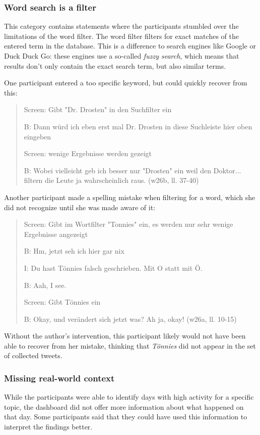 \subsubsection*{Word search is a filter}
This category contains statements where the participants stumbled over the limitations of the word filter. The word filter filters for exact matches of the entered term in the database. This is a difference to search engines like Google or Duck Duck Go: these engines use a so-called \emph{fuzzy search}, which means that results don't only contain the exact search term, but also similar terms.

One participant entered a too specific keyword, but could quickly recover from this:

\begin{quote}
    Screen: Gibt "Dr. Drosten" in den Suchfilter ein

    B: Dann würd ich eben erst mal Dr. Drosten in diese Suchleiste hier oben eingeben

    Screen: wenige Ergebnisse werden gezeigt

    B: Wobei vielleicht geb ich besser nur "Drosten" ein weil den Doktor... filtern die Leute ja wahrscheinlich raus. (w26b, ll. 37-40)
\end{quote}

Another participant made a spelling mistake when filtering for a word, which she did not recognize until she was made aware of it:

\begin{quote}
    Screen: Gibt im Wortfilter "Tonnies" ein, es werden nur sehr wenige Ergebnisse angezeigt

    B: Hm, jetzt seh ich hier gar nix

    I: Du hast T\"onnies falsch geschrieben. Mit O statt mit \"O.
    
    B: Aah, I see. 

    Screen: Gibt T\"onnies ein

    B: Okay, und verändert sich jetzt was? Ah ja, okay!  (w26a, ll. 10-15)
\end{quote}

Without the author's intervention, this participant likely would not have been able to recover from her mistake, thinking that \emph{Tönnies} did not appear in the set of collected tweets.

\subsubsection*{Missing real-world context}
While the participants were able to identify days with high activity for a specific topic, the dashboard did not offer more information about what happened on that day. Some participants said that they could have used this information to interpret the findings better.

